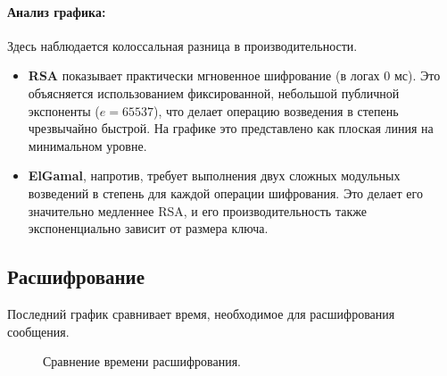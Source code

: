 \paragraph{Анализ графика:}
Здесь наблюдается колоссальная разница в производительности.
\begin{itemize}
    \item \textbf{RSA} показывает практически мгновенное шифрование (в логах 0 мс). Это объясняется использованием фиксированной, небольшой публичной экспоненты ($e=65537$), что делает операцию возведения в степень чрезвычайно быстрой. На графике это представлено как плоская линия на минимальном уровне.
    \item \textbf{ElGamal}, напротив, требует выполнения двух сложных модульных возведений в степень для каждой операции шифрования. Это делает его значительно медленнее RSA, и его производительность также экспоненциально зависит от размера ключа.
\end{itemize}

\subsection{Расшифрование}
Последний график сравнивает время, необходимое для расшифрования сообщения.

\begin{figure}[h!]
\centering
{}
\caption{Сравнение времени расшифрования.}
\label{fig:decryption}
\end{figure}

